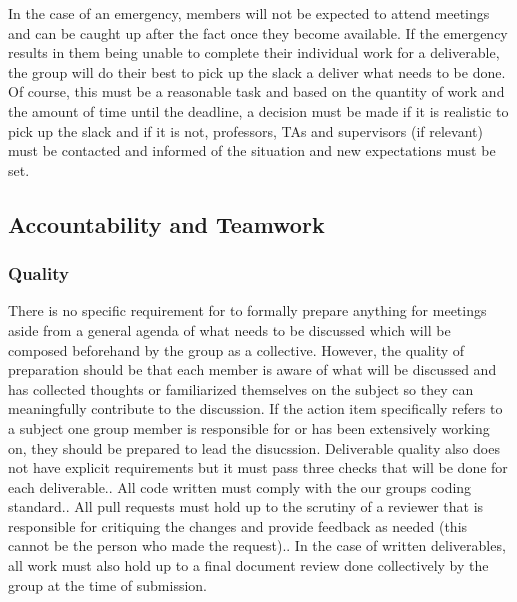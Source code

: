 \documentclass{article}
\begin{document}
\par{ In the case of an emergency, members will not be expected to attend meetings and can be caught up after the fact once they become available. 
If the emergency results in them being unable to complete their individual work for a deliverable, the group will do their best to pick up the slack
a deliver what needs to be done. Of course, this must be a reasonable task and based on the quantity of work and the amount of time until the deadline,
a decision must be made if it is realistic to pick up the slack and if it is not, professors, TAs and supervisors (if relevant) must be contacted and informed
of the situation and new expectations must be set.}


\subsection*{Accountability and Teamwork}

\subsubsection*{Quality} 


\par{There is no specific requirement for to formally prepare anything for meetings aside from a general agenda of what needs to be discussed which will be
composed beforehand by the group as a collective. However, the quality of preparation should be that each member is aware of what will be discussed and 
has collected thoughts or familiarized themselves on the subject so they can meaningfully contribute to the discussion. If the action item specifically 
refers to a subject one group member is responsible for or has been extensively working on, they should be prepared to lead the disucssion. \newline\newline\indent
Deliverable quality also does not have explicit requirements but it must pass three checks that will be done for each deliverable.\newline{}. All code written must comply with the our groups coding standard.. All pull requests must hold up to the scrutiny of a reviewer that is responsible for critiquing the changes and provide feedback as needed (this cannot be the person who made the request).. In the case of written deliverables, all work must also hold up to a final document review done collectively by the group at the time of submission.}  
\end{document}
